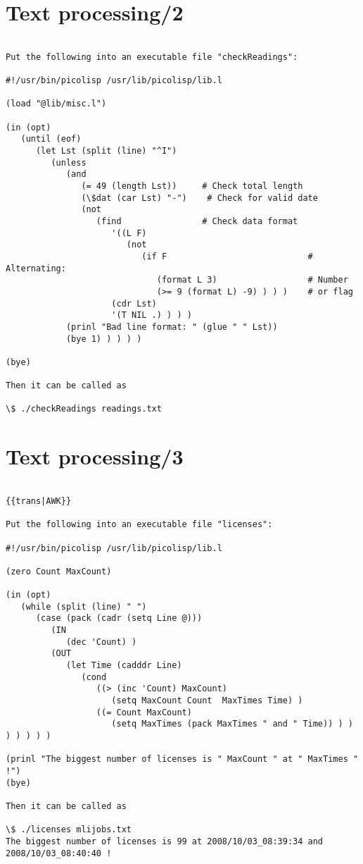 \section*{Text processing/2}

\begin{verbatim}

Put the following into an executable file "checkReadings":

#!/usr/bin/picolisp /usr/lib/picolisp/lib.l

(load "@lib/misc.l")

(in (opt)
   (until (eof)
      (let Lst (split (line) "^I")
         (unless
            (and
               (= 49 (length Lst))     # Check total length
               (\$dat (car Lst) "-")    # Check for valid date
               (not
                  (find                # Check data format
                     '((L F)
                        (not
                           (if F                            # Alternating:
                              (format L 3)                  # Number
                              (>= 9 (format L) -9) ) ) )    # or flag
                     (cdr Lst)
                     '(T NIL .) ) ) )
            (prinl "Bad line format: " (glue " " Lst))
            (bye 1) ) ) ) )

(bye)

Then it can be called as

\$ ./checkReadings readings.txt

\end{verbatim}

\section*{Text processing/3}

\begin{verbatim}

{{trans|AWK}}

Put the following into an executable file "licenses":

#!/usr/bin/picolisp /usr/lib/picolisp/lib.l

(zero Count MaxCount)

(in (opt)
   (while (split (line) " ")
      (case (pack (cadr (setq Line @)))
         (IN
            (dec 'Count) )
         (OUT
            (let Time (cadddr Line)
               (cond
                  ((> (inc 'Count) MaxCount)
                     (setq MaxCount Count  MaxTimes Time) )
                  ((= Count MaxCount)
                     (setq MaxTimes (pack MaxTimes " and " Time)) ) ) ) ) ) ) )

(prinl "The biggest number of licenses is " MaxCount " at " MaxTimes " !")
(bye)

Then it can be called as

\$ ./licenses mlijobs.txt
The biggest number of licenses is 99 at 2008/10/03_08:39:34 and 2008/10/03_08:40:40 !

\end{verbatim}


